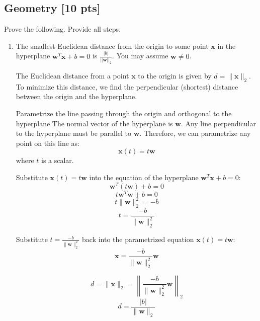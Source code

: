 \documentclass[letter]{article}
\theoremstyle{definition}
\newenvironment{soln}{
	\leavevmode\color{black}\ignorespaces
}{}
\begin{document}
	
	
	\subsection{Geometry [10 pts]}
	Prove the following.  Provide all steps.
	\begin{enumerate}
		\item 	The smallest Euclidean distance from the origin to some point $\mathbf{x}$ in the hyperplane $\mathbf{w}^{T}\mathbf{x} + b = 0$ is $\frac{|b|}{||\mathbf{w}||_2}$.  You may assume $\mathbf{w} \neq 0$.\\
		\begin{soln}

                
                The Euclidean distance from a point $\mathbf{x}$ to the origin is given by $d = \|\mathbf{x}\|_2$. To minimize this distance, we find the perpendicular (shortest) distance between the origin and the hyperplane.
                
                Parametrize the line passing through the origin and orthogonal to the hyperplane
                The normal vector of the hyperplane is $\mathbf{w}$. Any line perpendicular to the hyperplane must be parallel to $\mathbf{w}$. Therefore, we can parametrize any point on this line as:
                \[
                \mathbf{x}(t) = t \mathbf{w}
                \]
                where $t$ is a scalar.

                Substitute $\mathbf{x}(t) = t \mathbf{w}$ into the equation of the hyperplane $\mathbf{w}^T \mathbf{x} + b = 0$:
                \[
                \mathbf{w}^T (t \mathbf{w}) + b = 0
                \]
                \[
                t \mathbf{w}^T \mathbf{w} + b = 0
                \]
                \[
                t \|\mathbf{w}\|_2^2 = -b
                \]
                \[
                t = \frac{-b}{\|\mathbf{w}\|_2^2}
                \]

                Substitute $t = \frac{-b}{\|\mathbf{w}\|_2^2}$ back into the parametrized equation $\mathbf{x}(t) = t \mathbf{w}$:
                \[
                \mathbf{x} = \frac{-b}{\|\mathbf{w}\|_2^2} \mathbf{w}
                \]
                
                \[
                d = \|\mathbf{x}\|_2 = \left\| \frac{-b}{\|\mathbf{w}\|_2^2} \mathbf{w} \right\|_2
                \]
                \[
                d = \frac{|b|}{\|\mathbf{w}\|_2}
                \]
                
                
                \end{soln}
                    

\end{enumerate}
\end{document}
